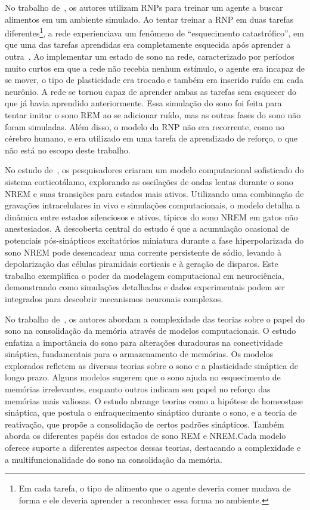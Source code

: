 No trabalho de~, os autores utilizam RNPs para treinar um agente a buscar alimentos em um ambiente
simulado. Ao tentar treinar a RNP em duas tarefas diferentes\footnote{Em cada tarefa, o tipo de alimento que o agente deveria
comer mudava de forma e ele deveria aprender a reconhecer essa forma no ambiente.}, a rede experienciava um fenômeno de
``esquecimento catastrófico'', em que uma das tarefas aprendidas era completamente esquecida após aprender a
outra~\cite{hasselmoAvoiding2017}. Ao implementar um estado de sono na rede, caracterizado por períodos muito curtos em que a rede
não recebia nenhum estímulo, o agente era incapaz de se mover, o tipo de plasticidade era trocado e também era inserido ruído em
cada neurônio. A rede se tornou capaz de aprender ambas as tarefas sem esquecer do que já havia aprendido anteriormente. Essa
simulação do sono foi feita para tentar imitar o sono REM ao se adicionar ruído, mas as outras fases do sono não foram simuladas.
Além disso, o modelo da RNP não era recorrente, como no cérebro humano, e era utilizado em uma tarefa de aprendizado de reforço, o
que não está no escopo deste trabalho.

No estudo de~, os pesquisadores criaram um modelo computacional sofisticado do sistema
corticotálamo, explorando as oscilações de ondas lentas durante o sono NREM e suas transições para estados mais ativos. Utilizando
uma combinação de gravações intracelulares in vivo e simulações computacionais, o modelo detalha a dinâmica entre estados
silenciosos e ativos, típicos do sono NREM em gatos não anestesiados. A descoberta central do estudo é que a acumulação ocasional
de potenciais pós-sinápticos excitatórios miniatura durante a fase hiperpolarizada do sono NREM pode desencadear uma corrente
persistente de sódio, levando à depolarização das células piramidais corticais e à geração de disparos. Este trabalho exemplifica
o poder da modelagem computacional em neurociência, demonstrando como simulações detalhadas e dados experimentais podem ser
integrados para descobrir mecanismos neuronais complexos.

No trabalho de~, os autores abordam a complexidade das teorias sobre o papel do sono na
consolidação da memória através de modelos computacionais. O estudo enfatiza a importância do sono para alterações duradouras na
conectividade sináptica, fundamentais para o armazenamento de memórias. Os modelos explorados refletem as diversas teorias sobre o
sono e a plasticidade sináptica de longo prazo. Alguns modelos sugerem que o sono ajuda no esquecimento de memórias irrelevantes,
enquanto outros indicam seu papel no reforço das memórias mais valiosas. O estudo abrange teorias como a hipótese de homeostase
sináptica, que postula o enfraquecimento sináptico durante o sono, e a teoria de reativação, que propõe a consolidação de certos
padrões sinápticos. Também aborda os diferentes papéis dos estados de sono REM e NREM.\@ Cada modelo oferece suporte a diferentes
aspectos dessas teorias, destacando a complexidade e a multifuncionalidade do sono na consolidação da memória.

